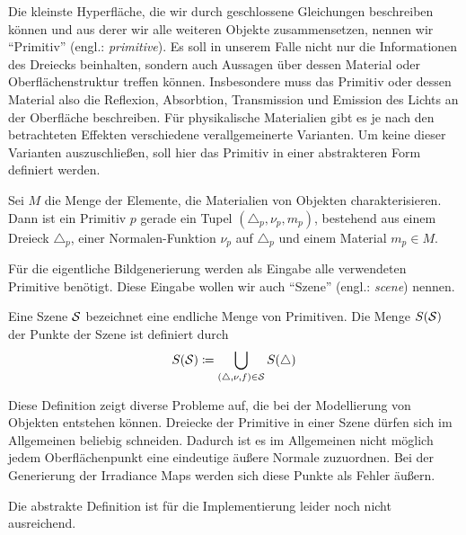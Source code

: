 		Die kleinste Hyperfläche, die wir durch geschlossene Gleichungen beschreiben können und aus derer wir alle weiteren Objekte zusammensetzen, nennen wir \enquote{Primitiv} (engl.: \textit{primitive}).
		Es soll in unserem Falle nicht nur die Informationen des Dreiecks beinhalten, sondern auch Aussagen über dessen Material oder Oberflächenstruktur treffen können.
		Insbesondere muss das Primitiv oder dessen Material also die Reflexion, Absorbtion, Transmission und Emission des Lichts an der Oberfläche beschreiben.
		Für physikalische Materialien gibt es je nach den betrachteten Effekten verschiedene verallgemeinerte Varianten.
		Um keine dieser Varianten auszuschließen, soll hier das Primitiv in einer abstrakteren Form definiert werden.
		\begin{definition}[Primitiv]
			Sei $M$ die Menge der Elemente, die Materialien von Objekten charakterisieren.
			Dann ist ein Primitiv $p$ gerade ein Tupel $(\triangle_p, \nu_p, m_p)$, bestehend aus einem Dreieck $\triangle_p$, einer Normalen-Funktion $\nu_p$ auf $\triangle_p$ und einem Material $m_p\in M$.
		\end{definition}


		Für die eigentliche Bildgenerierung werden als Eingabe alle verwendeten Primitive benötigt.
		Diese Eingabe wollen wir auch \enquote{Szene} (engl.: \textit{scene}) nennen.
		\begin{definition}[Szene]
			Eine Szene $\mathcal{S}$ bezeichnet eine endliche Menge von Primitiven.
			Die Menge $S(\mathcal{S})$ der Punkte der Szene ist definiert durch
			\[
				S(\mathcal{S}) \coloneqq \bigcup_{(\triangle,\nu,f)\in\mathcal{S}} S(\triangle)
			\]
		\end{definition}

		Diese Definition zeigt diverse Probleme auf, die bei der Modellierung von Objekten entstehen können.
		Dreiecke der Primitive in einer Szene dürfen sich im Allgemeinen beliebig schneiden.
		Dadurch ist es im Allgemeinen nicht möglich jedem Oberflächenpunkt eine eindeutige äußere Normale zuzuordnen.
		Bei der Generierung der Irradiance Maps werden sich diese Punkte als Fehler äußern.

		Die abstrakte Definition ist für die Implementierung leider noch nicht ausreichend.

